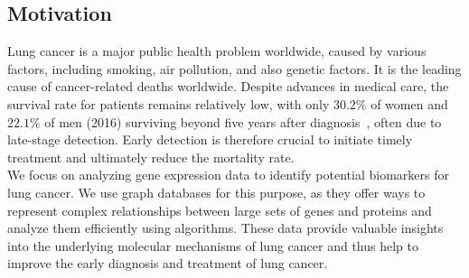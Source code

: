 \subsection{Motivation} \label{subsec:motivation}

Lung cancer is a major public health problem worldwide, caused by various factors,
including smoking, air pollution, and also genetic factors.
It is the leading cause of cancer-related deaths worldwide\cite{ferlay2024global}.
Despite advances in medical care, the survival rate for patients remains relatively low,
with only $30.2\%$ of women and $22.1\%$ of men (2016)
surviving beyond five years after diagnosis~\cite{seer2024explorer}, often due to late-stage detection.
Early detection is therefore crucial to initiate timely treatment and ultimately reduce the mortality rate.
\\

We focus on analyzing gene expression data to identify potential biomarkers for lung cancer.
We use graph databases for this purpose,
as they offer ways to represent complex relationships between large sets of genes and proteins
and analyze them efficiently using algorithms.
These data provide valuable insights into the underlying molecular mechanisms of lung cancer
and thus help to improve the early diagnosis and treatment of lung cancer.